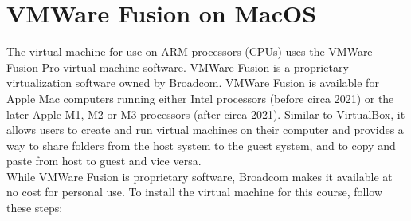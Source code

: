 \section{VMWare Fusion on MacOS}
The virtual machine for use on ARM processors (CPUs) uses the VMWare Fusion Pro virtual machine software. VMWare Fusion is a proprietary virtualization software owned by Broadcom. VMWare Fusion is available for Apple Mac computers running either Intel processors (before circa 2021) or the later Apple M1, M2 or M3 processors (after circa 2021). Similar to VirtualBox, it allows users to create and run virtual machines on their computer and provides a way to share folders from the host system to the guest system, and to copy and paste from host to guest and vice versa. \\
 
While VMWare Fusion is proprietary software, Broadcom makes it available at no cost for personal use. To install the virtual machine for this course, follow these steps:

